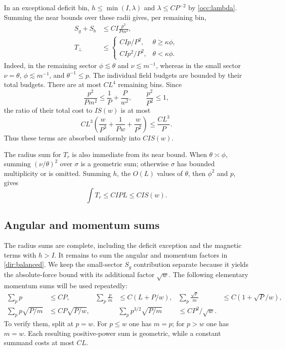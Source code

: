 In an exceptional deficit bin,
$h\le\min(I,\lambda)$ and $\lambda\le CP^{-2}$ by
\eqref{occ:lambda}.  Summing the near bounds over these radii gives,
per remaining bin,
\begin{equation}\label{dir:deficit}
 \begin{aligned}
 S_g+S_b&\le CI\frac{p^2}{Pm^2},\\
 T_\perp&\le
 \begin{cases}
  CIp/P^2,&\theta\ge\kappa\phi,\\
  CIp^2/P^2,&\theta<\kappa\phi.
 \end{cases}
 \end{aligned}
\end{equation}
Indeed, in the remaining sector $\phi\lesssim\theta$ and
$\nu\lesssim m^{-1}$, whereas in the small sector
$\nu=\theta$, $\phi\lesssim m^{-1}$, and $\theta^{-1}\le p$.
The individual field budgets are bounded by their total budgets.
There are at most $CL^4$ remaining bins.  Since
\[
 \frac{p^2}{Pm^2}\le \frac1P+\frac{P}{w^2},\qquad
 \frac{p^2}{P^2}\le1,
\]
the ratio of their total cost to $I S(w)$ is at most
\[
 CL^3\left(\frac{w}{P^3}+\frac1{Pw}+\frac{w}{P^2}\right)
 \le \frac{CL^3}{P}.
\]
Thus these terms are absorbed uniformly into $CI S(w)$.

The radius sum for $T_r$ is also immediate from its near bound.
When $\theta\asymp\phi$, summing $(\nu/\theta)^2$ over $\sigma$
is a geometric sum; otherwise $\sigma$ has bounded multiplicity or
is omitted.  Summing $h$, the $O(L)$ values of $\theta$, then
$\phi^2$ and $p$, gives
\begin{equation}\label{dir:radial-transport}
 \int T_r\le CIPL\le CI S(w).
\end{equation}

\subsection{Angular and momentum sums}

The radius sums are complete, including the deficit exception and the
magnetic terms with $h>I$. It remains to sum the angular and momentum
factors in \eqref{dir:balanced}. We keep the small-sector $S_g$
contribution separate because it yields the absolute-force bound with
its additional factor $\sqrt w$. The following elementary momentum
sums will be used repeatedly:
\begin{equation}\label{dir:momentum-sums}
 \begin{aligned}
 \sum_p p&\le CP,&
 \sum_p\frac p m&\le C(L+P/w),&
 \sum_p\frac{\sqrt p}{m}&\le C(1+\sqrt P/w),\\
 \sum_p p\sqrt{P/m}&\le CP\sqrt{P/w},&&
 \sum_p p^{3/2}\sqrt{P/m}&\le CP^2/\sqrt w.
 \end{aligned}
\end{equation}
To verify them, split at $p=w$.  For $p\le w$ one has $m=p$;
for $p>w$ one has $m=w$.  Each resulting positive-power sum is
geometric, while a constant summand costs at most $CL$.

